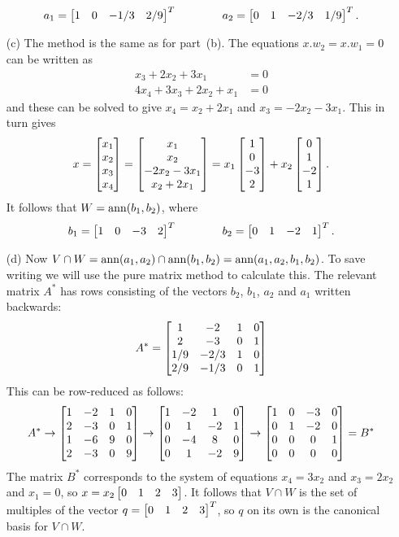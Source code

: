 \documentclass[a4paper]{amsart}
\renewenvironment{solution}{\SolutionInline}{\endSolutionInline}
\begin{document}
\begin{solution}
\begin{itemize}
   \[ a_1 = \left[\begin{matrix} 1&0&-1/3&2/9\end{matrix}\right]^T \hspace{4em}
      a_2 = \left[\begin{matrix} 0&1&-2/3&1/9\end{matrix}\right]^T. 
   \]
  \item[(c)] The method is the same as for part~(b).  The equations
   $x.w_2=x.w_1=0$ can be written as
   \begin{align*}
    x_3 + 2x_2 + 3x_1 &= 0 \\
    4x_4+ 3x_3 + 2x_2 + x_1 &= 0 
   \end{align*}
   and these can be solved to give $x_4=x_2+2x_1$ and
   $x_3=-2x_2-3x_1$.  This in turn gives
   \[ x = \left[\begin{matrix} x_1\\x_2\\x_3\\x_4 \end{matrix}\right] 
      = \left[\begin{matrix} x_1 \\ x_2 \\ -2x_2-3x_1 \\ x_2+2x_1 \end{matrix}\right] 
      = x_1 \left[\begin{matrix} 1 \\ 0 \\ -3 \\ 2 \end{matrix}\right] +
        x_2 \left[\begin{matrix} 0 \\ 1 \\ -2 \\ 1 \end{matrix}\right].
   \]
   It follows that $W=\operatorname{ann}(b_1,b_2)$, where 
   \[ b_1 = \left[\begin{matrix} 1&0&-3&2\end{matrix}\right]^T \hspace{4em}
      b_2 = \left[\begin{matrix} 0&1&-2&1\end{matrix}\right]^T. 
   \]
  \item[(d)] Now
   $V\cap W=\operatorname{ann}(a_1,a_2)\cap\operatorname{ann}(b_1,b_2)=\operatorname{ann}(a_1,a_2,b_1,b_2)$.  
   To save writing we will use the pure matrix method to calculate
   this.  The relevant matrix $A^*$ has rows consisting of the vectors
   $b_2$, $b_1$, $a_2$ and $a_1$ written backwards:
   \[ A^* =
       \left[\begin{matrix}
        1 & -2 & 1 & 0 \\
        2 & -3 & 0 & 1 \\
        1/9 & -2/3 & 1 & 0 \\
        2/9 & -1/3 & 0 & 1
       \end{matrix}\right]
   \]
   This can be row-reduced as follows:
   \[ A^* \to 
       \left[\begin{matrix}
        1 & -2 & 1 & 0 \\
        2 & -3 & 0 & 1 \\
        1 & -6 & 9 & 0 \\
        2 & -3 & 0 & 9
       \end{matrix}\right]
       \to
       \left[\begin{matrix}
        1 & -2 & 1 & 0 \\
        0 &  1 &-2 & 1 \\
        0 & -4 & 8 & 0 \\
        0 &  1 &-2 & 9
       \end{matrix}\right]
       \to
       \left[\begin{matrix}
        1 &  0 &-3 & 0 \\
        0 &  1 &-2 & 0 \\
        0 &  0 & 0 & 1 \\
        0 &  0 & 0 & 0
       \end{matrix}\right]  =B^*
   \]
   The matrix $B^*$ corresponds to the system of equations $x_4=3x_2$
   and $x_3=2x_2$ and $x_1=0$, so $x=x_2\left[\begin{matrix} 0&1&2&3\end{matrix}\right]$.  It follows
   that $V\cap W$ is the set of multiples of the vector
   $q=\left[\begin{matrix} 0&1&2&3\end{matrix}\right]^T$, so $q$ on its own is the canonical basis
   for $V\cap W$.
 \end{itemize}
\end{solution}
\end{document}
